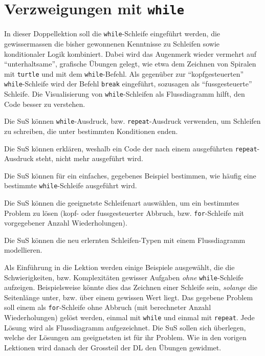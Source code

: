 \section{Verzweigungen mit \texorpdfstring{\lstinline|while|}{while}}
\begin{myExBox}
	In dieser Doppellektion soll die \lstinline|while|-Schleife eingeführt werden, die gewissermassen die bisher gewonnenen Kenntnisse zu Schleifen sowie konditionaler Logik kombiniert. Dabei wird das Augenmerk wieder vermehrt auf \enquote{unterhaltsame}, grafische Übungen gelegt, wie etwa dem Zeichnen von Spiralen mit \lstinline|turtle| und mit dem \lstinline|while|-Befehl. Als gegenüber zur \enquote{kopfgesteuerten} \lstinline|while|-Schleife wird der Befehl \lstinline|break| eingeführt, sozusagen als \enquote{fussgesteuerte} Schleife. Die Visualisierung von \lstinline|while|-Schleifen als Flussdiagramm hilft, den Code besser zu verstehen.

	\begin{todolist}
		\item Die SuS können \lstinline|while|-Ausdruck, bzw. \lstinline|repeat|-Ausdruck verwenden, um Schleifen zu schreiben, die unter bestimmten Konditionen enden.
		\item Die SuS können erklären, weshalb ein Code der nach einem ausgeführten \lstinline|repeat|-Ausdruck steht, nicht mehr ausgeführt wird.
		\item Die SuS können für ein einfaches, gegebenes Beispiel bestimmen, wie häufig eine bestimmte \lstinline|while|-Schleife ausgeführt wird.
		\item Die SuS können die geeignetste Schleifenart auswählen, um ein bestimmtes Problem zu lösen (kopf- oder fussgesteuerter Abbruch, bzw. \lstinline|for|-Schleife mit vorgegebener Anzahl Wiederholungen).
		\item Die SuS können die neu erlernten Schleifen-Typen mit einem Flussdiagramm modellieren.
	\end{todolist}


	Als Einführung in die Lektion werden einige Beispiele ausgewählt, die die Schwierigkeiten, bzw. Komplexitäten gewisser Aufgaben \textit{ohne} \lstinline|while|-Schleife aufzeigen. Beispielsweise könnte dies das Zeichnen einer Schleife sein, \textit{solange} die Seitenlänge unter, bzw. über einem gewissen Wert liegt. Das gegebene Problem soll einem als \lstinline|for|-Schleife ohne Abbruch (mit berechneter Anzahl Wiederholungen) gelöst werden, einmal mit \lstinline|while| und einmal mit \lstinline|repeat|. Jede Lösung wird als Flussdiagramm aufgezeichnet. Die SuS sollen sich überlegen, welche der Lösungen am geeignetsten ist für ihr Problem. Wie in den vorigen Lektionen wird danach der Grossteil der DL den Übungen gewidmet.


\end{myExBox}
